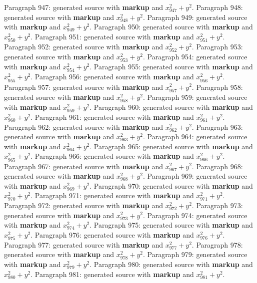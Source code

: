 \documentclass{article}
\begin{document}
Paragraph 947: generated source with \textbf{markup} and $x_{947}^2 + y^2$.
Paragraph 948: generated source with \textbf{markup} and $x_{948}^2 + y^2$.
Paragraph 949: generated source with \textbf{markup} and $x_{949}^2 + y^2$.
Paragraph 950: generated source with \textbf{markup} and $x_{950}^2 + y^2$.
Paragraph 951: generated source with \textbf{markup} and $x_{951}^2 + y^2$.
Paragraph 952: generated source with \textbf{markup} and $x_{952}^2 + y^2$.
Paragraph 953: generated source with \textbf{markup} and $x_{953}^2 + y^2$.
Paragraph 954: generated source with \textbf{markup} and $x_{954}^2 + y^2$.
Paragraph 955: generated source with \textbf{markup} and $x_{955}^2 + y^2$.
Paragraph 956: generated source with \textbf{markup} and $x_{956}^2 + y^2$.
Paragraph 957: generated source with \textbf{markup} and $x_{957}^2 + y^2$.
Paragraph 958: generated source with \textbf{markup} and $x_{958}^2 + y^2$.
Paragraph 959: generated source with \textbf{markup} and $x_{959}^2 + y^2$.
Paragraph 960: generated source with \textbf{markup} and $x_{960}^2 + y^2$.
Paragraph 961: generated source with \textbf{markup} and $x_{961}^2 + y^2$.
Paragraph 962: generated source with \textbf{markup} and $x_{962}^2 + y^2$.
Paragraph 963: generated source with \textbf{markup} and $x_{963}^2 + y^2$.
Paragraph 964: generated source with \textbf{markup} and $x_{964}^2 + y^2$.
Paragraph 965: generated source with \textbf{markup} and $x_{965}^2 + y^2$.
Paragraph 966: generated source with \textbf{markup} and $x_{966}^2 + y^2$.
Paragraph 967: generated source with \textbf{markup} and $x_{967}^2 + y^2$.
Paragraph 968: generated source with \textbf{markup} and $x_{968}^2 + y^2$.
Paragraph 969: generated source with \textbf{markup} and $x_{969}^2 + y^2$.
Paragraph 970: generated source with \textbf{markup} and $x_{970}^2 + y^2$.
Paragraph 971: generated source with \textbf{markup} and $x_{971}^2 + y^2$.
Paragraph 972: generated source with \textbf{markup} and $x_{972}^2 + y^2$.
Paragraph 973: generated source with \textbf{markup} and $x_{973}^2 + y^2$.
Paragraph 974: generated source with \textbf{markup} and $x_{974}^2 + y^2$.
Paragraph 975: generated source with \textbf{markup} and $x_{975}^2 + y^2$.
Paragraph 976: generated source with \textbf{markup} and $x_{976}^2 + y^2$.
Paragraph 977: generated source with \textbf{markup} and $x_{977}^2 + y^2$.
Paragraph 978: generated source with \textbf{markup} and $x_{978}^2 + y^2$.
Paragraph 979: generated source with \textbf{markup} and $x_{979}^2 + y^2$.
Paragraph 980: generated source with \textbf{markup} and $x_{980}^2 + y^2$.
Paragraph 981: generated source with \textbf{markup} and $x_{981}^2 + y^2$.
\end{document}
